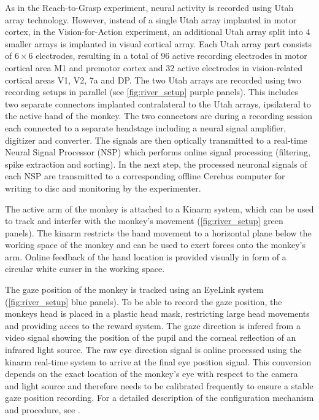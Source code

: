 As in the Reach-to-Grasp experiment, neural activity is recorded using Utah array technology. However, instead of a single Utah array implanted in motor cortex, in the Vision-for-Action experiment, an additional Utah array split into $4$ smaller arrays is implanted in visual cortical array. Each Utah array part consists of $6\times6$ electrodes, resulting in a total of $96$ active recording electrodes in motor cortical area M1 and premotor cortex and $32$  active electrodes in vision-related cortical areas V1, V2, 7a and DP. The two Utah arrays are recorded using two recording setups in parallel (see \cref{fig:river_setup} purple panels). This includes two separate connectors implanted contralateral to the Utah arrays, ipsilateral to the active hand of the monkey. The two connectors are during a recording session each connected to a separate headstage including a neural signal amplifier, digitizer and converter. The signals are then optically transmitted to a real-time Neural Signal Processor (NSP) which performs online signal processing (filtering, spike extraction and sorting). In the next step, the processed neuronal signals of each NSP are transmitted to a corresponding offline Cerebus computer for writing to disc and monitoring by the experimenter.

The active arm of the monkey is attached to a Kinarm system, which can be used to track and interfer with the monkey's movement (\cref{fig:river_setup} green panels). The kinarm restricts the hand movement to a horizontal plane below the working space of the monkey and can be used to exert forces onto the monkey's arm. Online feedback of the hand location is provided visually in form of a circular white curser in the working space.

The gaze position of the monkey is tracked using an EyeLink system (\cref{fig:river_setup} blue panels). To be able to record the gaze position, the monkeys head is placed in a plastic head mask, restricting large head movements and providing acces to the reward system. The gaze direction is infered from a video signal showing the position of the pupil and the corneal reflection of an infrared light source. The raw eye direction signal is online processed using the kinarm real-time system to arrive at the final eye position signal. This conversion depends on the exact location of the monkey's eye with respect to the camera and light source and therefore needs to be calibrated frequently to ensure a stable gaze position recording. For a detailed description of the configuration mechanism and procedure, see \citet{deHaan_2018}.

